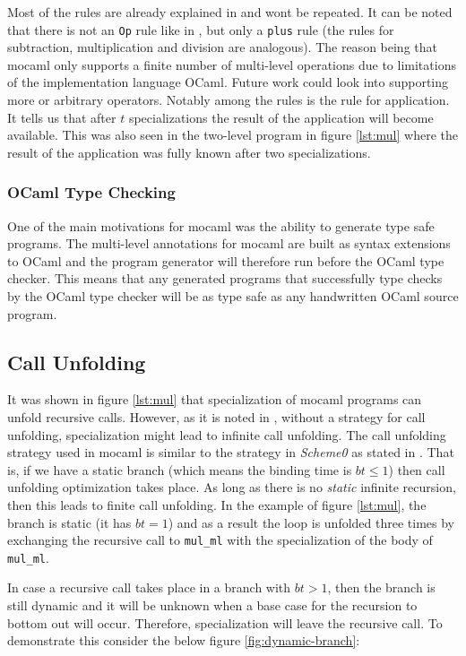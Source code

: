 Most of the rules are already explained in \cite{multilevel} and wont be repeated. It can be noted that there is not an \texttt{Op} rule like in \cite{multilevel}, but only a \texttt{plus} rule (the rules for subtraction, multiplication and division are analogous). The reason being that mocaml only supports a finite number of multi-level operations due to limitations of the implementation language OCaml. Future work could look into supporting more or arbitrary operators. Notably among the rules is the rule for application. It tells us that after $t$ specializations the result of the application will become available. This was also seen in the two-level program in figure \ref{lst:mul} where the result of the application was fully known after two specializations. %

\subsubsection{OCaml Type Checking}

One of the main motivations for mocaml was the ability to generate type safe programs. The multi-level annotations for mocaml are built as syntax extensions to OCaml and the program generator will therefore run before the OCaml type checker. This means that any generated programs that successfully type checks by the OCaml type checker will be as type safe as any handwritten OCaml source program.

\subsection{Call Unfolding}
It was shown in figure \ref{lst:mul} that specialization of mocaml programs can unfold recursive calls. However, as it is noted in \cite{jones1993chapter5.5}, without a strategy for call unfolding, specialization might lead to infinite call unfolding. The call unfolding strategy used in mocaml is similar to the strategy in \textit{Scheme0} as stated in \cite{jones1993chapter5.5}. That is, if we have a static branch (which means the binding time is $bt \le 1$) then call unfolding optimization takes place. As long as there is no \textit{static} infinite recursion, then this leads to finite call unfolding. In the example of figure \ref{lst:mul}, the branch is static (it has $bt=1$) and as a result the loop is unfolded three times by exchanging the recursive call to \texttt{mul\_ml} with the specialization of the body of \texttt{mul\_ml}.

In case a recursive call takes place in a branch with $bt > 1$, then the branch is still dynamic and it will be unknown when a base case for the recursion to bottom out will occur. Therefore, specialization will leave the recursive call. To demonstrate this consider the below figure \ref{fig:dynamic-branch}:


